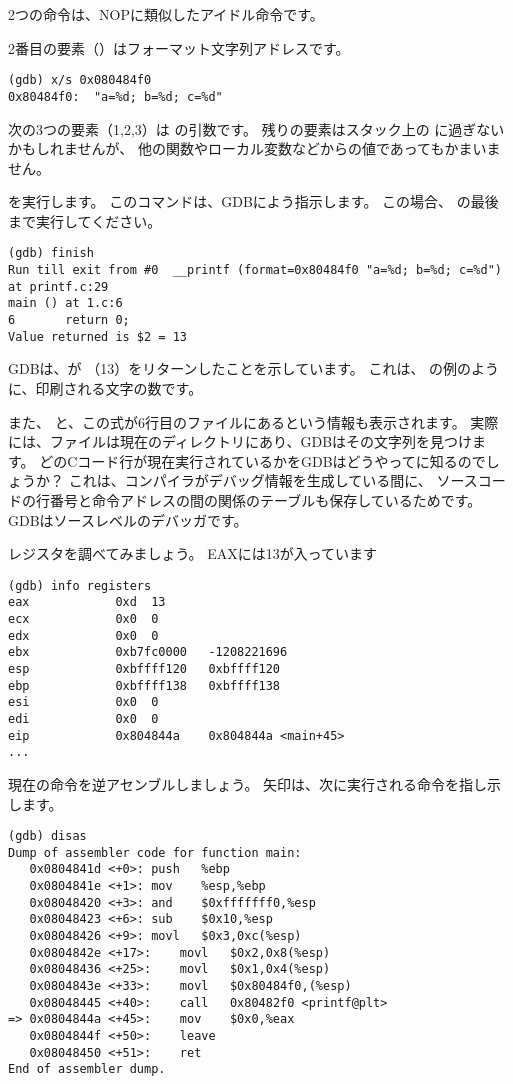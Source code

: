 2つの命令は、\ac{NOP}に類似したアイドル命令です。

2番目の要素（）はフォーマット文字列アドレスです。

\begin{lstlisting}
(gdb) x/s 0x080484f0
0x80484f0:	"a=%d; b=%d; c=%d"
\end{lstlisting}

次の3つの要素（1,2,3）は \printf の引数です。
残りの要素はスタック上の に過ぎないかもしれませんが、
他の関数やローカル変数などからの値であってもかまいません。

を実行します。 
このコマンドは、GDBによう指示します。 
この場合、 \printf の最後まで実行してください。

\begin{lstlisting}
(gdb) finish
Run till exit from #0  __printf (format=0x80484f0 "a=%d; b=%d; c=%d") at printf.c:29
main () at 1.c:6
6		return 0;
Value returned is $2 = 13
\end{lstlisting}

\ac{GDB}は、\printf が \EAX （13）をリターンしたことを示しています。 
これは、 \olly の例のように、印刷される文字の数です。

また、 と、この式が6行目のファイルにあるという情報も表示されます。
実際には、ファイルは現在のディレクトリにあり、\ac{GDB}はその文字列を見つけます。 
どのCコード行が現在実行されているかを\ac{GDB}はどうやってに知るのでしょうか？
これは、コンパイラがデバッグ情報を生成している間に、
ソースコードの行番号と命令アドレスの間の関係のテーブルも保存しているためです。 
GDBはソースレベルのデバッガです。

レジスタを調べてみましょう。 
EAXには13が入っています

\begin{lstlisting}
(gdb) info registers
eax            0xd	13
ecx            0x0	0
edx            0x0	0
ebx            0xb7fc0000	-1208221696
esp            0xbffff120	0xbffff120
ebp            0xbffff138	0xbffff138
esi            0x0	0
edi            0x0	0
eip            0x804844a	0x804844a <main+45>
...
\end{lstlisting}

現在の命令を逆アセンブルしましょう。
矢印は、次に実行される命令を指し示します。

\begin{lstlisting}[style=customasmx86]
(gdb) disas
Dump of assembler code for function main:
   0x0804841d <+0>:	push   %ebp
   0x0804841e <+1>:	mov    %esp,%ebp
   0x08048420 <+3>:	and    $0xfffffff0,%esp
   0x08048423 <+6>:	sub    $0x10,%esp
   0x08048426 <+9>:	movl   $0x3,0xc(%esp)
   0x0804842e <+17>:	movl   $0x2,0x8(%esp)
   0x08048436 <+25>:	movl   $0x1,0x4(%esp)
   0x0804843e <+33>:	movl   $0x80484f0,(%esp)
   0x08048445 <+40>:	call   0x80482f0 <printf@plt>
=> 0x0804844a <+45>:	mov    $0x0,%eax
   0x0804844f <+50>:	leave  
   0x08048450 <+51>:	ret    
End of assembler dump.
\end{lstlisting}

